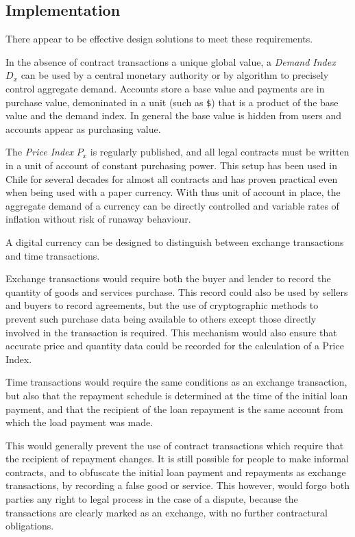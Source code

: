 \subsection{Implementation}
    
There appear to be effective design solutions to meet these requirements.

In the absence of contract transactions a unique global value, a \emph{Demand Index} $D_x$ can be
used by a central monetary authority or by algorithm to precisely control aggregate demand. Accounts
store a base value and payments are in purchase value, demoninated in a unit (such as \verb|$|) that
is a product of the base value and the demand index. In general the base value is hidden from users
and accounts appear as purchasing value.

The \emph{Price Index} $P_x$ is regularly published, and all legal contracts must be written in a
unit of account of constant purchasing power. This setup has been used in Chile for several decades
for almost all contracts and has proven practical even when being used with a paper currency. With
thus unit of account in place, the aggregate demand of a currency can be directly controlled and
variable rates of inflation without risk of runaway behaviour. 

A digital currency can be designed to distinguish between exchange transactions and time
transactions.

Exchange transactions would require both the buyer and lender to record the quantity of goods and
services purchase. This record could also be used by sellers and buyers to record agreements, but
the use of cryptographic methods to prevent such purchase data being available to others except
those directly involved in the transaction is required. This mechanism would also ensure that
accurate price and quantity data could be recorded for the calculation of a Price Index. 

Time transactions would require the same conditions as an exchange transaction, but also that the
repayment schedule is determined at the time of the initial loan payment, and that the recipient of
the loan repayment is the same account from which the load payment was made.

This would generally prevent the use of contract transactions which require that the recipient of
repayment changes. It is still possible for people to make informal contracts, and to obfuscate the
initial loan payment and repayments as exchange transactions, by recording a false good or service.
This however, would forgo both parties any right to legal process in the case of a dispute, because
the transactions are clearly marked as an exchange, with no further contractural obligations.


